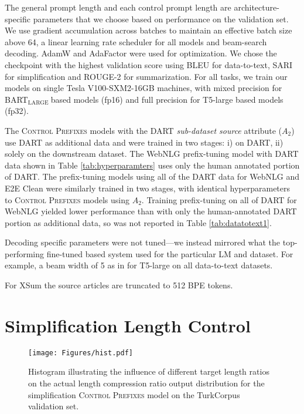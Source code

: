 \documentclass[11pt]{article}
\newcommand{\control}{\textsc{Control Prefixes}\xspace}
\newcommand{\bartl}{BART$_{\text {LARGE }}$}
\begin{document}
The general prompt length and each control prompt length are
architecture-specific parameters that we choose based on performance on the validation
set.  We use gradient accumulation across batches to maintain an effective batch size above 64, a linear learning rate scheduler for all models and beam-search decoding. AdamW \citep{adamw}
and AdaFactor \citep{adafactor} were used for optimization. We chose the checkpoint with the highest validation score using BLEU for data-to-text, SARI for simplification and ROUGE-2 for summarization. For all tasks, we train our models on single Tesla V100-SXM2-16GB machines, with mixed precision for \bartl based models (fp16) and full precision for T5-large based models (fp32).

The \control models with the DART \emph{sub-dataset source} attribute ($A_{2}$) use DART as additional data and were trained in two stages: i) on DART, ii) solely on the downstream dataset. The WebNLG prefix-tuning model with DART data shown in Table \ref{tab:hyperparamters} uses only the human annotated portion of DART. The prefix-tuning models using all of the DART data for WebNLG and E2E Clean were similarly trained in two stages, with identical hyperparameters to \control models using $A_2$. Training prefix-tuning on all of DART for WebNLG yielded lower performance than with only the human-annotated DART portion as additional data, so was not reported in Table \ref{tab:datatotext1}.

Decoding specific parameters were not tuned—we instead mirrored what the top-performing fine-tuned based system used for the particular LM and dataset. For example, a beam width of 5 as in \citet{ribeiro} for T5-large on all data-to-text datasets. 

For XSum the source articles are truncated to 512 BPE tokens.





\section{Simplification Length Control}
\label{app:length_control}
\begin{figure}[h]
\centering
    \texttt{[image: Figures/hist.pdf]}
        \caption{\small{Histogram illustrating the influence of different target length ratios on the actual length compression ratio output distribution for the simplification \control model on the TurkCorpus validation set.}}
\label{fig:app_hist}
\end{figure}
\end{document}
